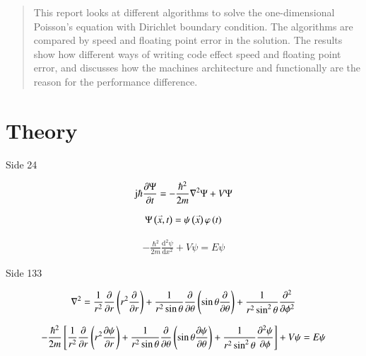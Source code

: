 \documentclass[11pt,english,a4paper]{article}
\begin{document}
\maketitle
\begin{flushleft}

\begin{abstract}
This report looks at different algorithms to solve the one-dimensional Poisson's equation with Dirichlet boundary condition. The algorithms are compared by speed and floating point error in the solution. The results show how different ways of writing code effect speed and floating point error, and discusses how the machines architecture and functionally are the reason for the performance difference.
\end{abstract}

\section{Theory}

Side 24

\begin{align*}
\im \hbar \frac{\partial \Psi}{\partial t} =- \frac{\hbar^2}{2m} \nabla^2 \Psi + V \Psi
\end{align*}

\begin{align*}
\Psi\left({\accentset{\rightarrow}{x},t}\right) = \psi\left({\accentset{\rightarrow}{x}}\right) \varphi\left({t}\right)
\end{align*}

\begin{align*}
-\frac{\hbar^2}{2m} \frac{\mathrm{d}^2 \psi}{\mathrm{d} x^2} + V \psi = E \psi
\end{align*}

Side 133

\begin{align*}
\nabla^2 = \frac{1}{r^2} \frac{\partial}{\partial r}\left({r^2 \frac{\partial }{\partial r}}\right) + \frac{1}{r^2 \sin \theta} \frac{\partial}{\partial \theta}\left({\sin \theta \frac{\partial }{\partial \theta}}\right) + \frac{1}{r^2 \sin^2 \theta} \frac{\partial^2}{\partial \phi^2}
\end{align*}

\begin{align*}
-\frac{\hbar^2}{2m}\left[{\frac{1}{r^2} \frac{\partial}{\partial r}\left({r^2 \frac{\partial \psi}{\partial r}}\right) + \frac{1}{r^2 \sin \theta} \frac{\partial}{\partial \theta}\left({\sin\theta \frac{\partial \psi}{\partial \theta}}\right) + \frac{1}{r^2 \sin^2 \theta} \frac{\partial^2 \psi}{\partial \phi}}\right] + V \psi = E \psi
\end{align*}


\end{flushleft}
\end{document}
